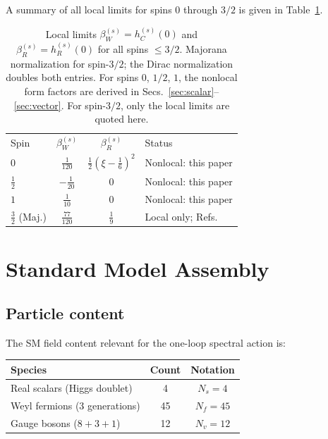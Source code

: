 \documentclass[aps,prd,twocolumn,superscriptaddress,nofootinbib,floatfix]{revtex4-2}
\theoremstyle{definition}
\theoremstyle{remark}
\begin{document}
A summary of all local limits for spins $0$ through $3/2$ is given in
Table~\ref{tab:all-spins}.

\begin{table}[t]
\caption{Local limits $\beta_W^{(s)} = h_C^{(s)}(0)$ and
$\beta_R^{(s)} = h_R^{(s)}(0)$ for all spins $\leq 3/2$. Majorana
normalization for spin-$3/2$; the Dirac normalization doubles both entries.
For spins $0$, $1/2$, $1$, the nonlocal form factors are derived in
Secs.~\ref{sec:scalar}--\ref{sec:vector}. For spin-$3/2$, only the local
limits are quoted here.}
\label{tab:all-spins}
\begin{ruledtabular}
\begin{tabular}{lccl}
Spin & $\beta_W^{(s)}$ & $\beta_R^{(s)}$ & Status \\
\colrule
$0$ & $\frac{1}{120}$ & $\frac{1}{2}(\xi - \frac{1}{6})^2$ &
  Nonlocal: this paper \\[3pt]
$\frac{1}{2}$ & $-\frac{1}{20}$ & $0$ &
  Nonlocal: this paper \\[3pt]
$1$ & $\frac{1}{10}$ & $0$ &
  Nonlocal: this paper \\[3pt]
$\frac{3}{2}$ (Maj.) & $\frac{77}{120}$ & $\frac{1}{9}$ &
  Local only; Refs.~\cite{KaranPanda:2021,ChristensenDuff:1979} \\
\end{tabular}
\end{ruledtabular}
\end{table}


\section{Standard Model Assembly}
\label{sec:sm}

\subsection{Particle content}

The SM field content relevant for the one-loop spectral action is:
\begin{center}
\renewcommand{\arraystretch}{1.2}
\begin{tabular}{@{}lcc@{}}
  \toprule
  Species & Count & Notation \\
  \midrule
  Real scalars (Higgs doublet) & 4 & $N_s = 4$ \\
  Weyl fermions (3 generations) & 45 & $N_f = 45$ \\
  Gauge bosons ($8+3+1$) & 12 & $N_v = 12$ \\
  \bottomrule
\end{tabular}
\end{center}
\end{document}
